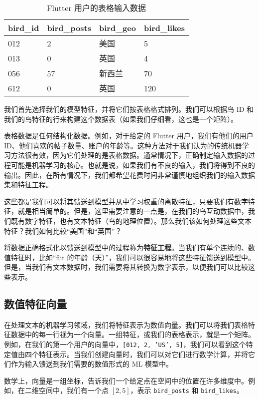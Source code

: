 \documentclass[Chinese, 11pt, table]{diazessay} %
\begin{document}
\begin{CJK}{UTF8}{gbsn}
\begin{sloppypar}
\begin{table}[H]
  \centering
    \caption{Flutter 用户的表格输入数据}
\begin{tabular}{|l|l|l|l|}
\hline
\rowcolor[HTML]{D5E7F7}
bird\_id & bird\_posts & bird\_geo & bird\_likes \\ \hline
012 	 & 2  		 & 美国   	 & 5  		 \\ \hline
013 	 & 0  		 & 英国   	 & 4  		 \\ \hline
056 	 & 57 		 & 新西兰   	 & 70 		 \\ \hline
612 	 & 0  		 & 英国   	 & 120		 \\ \hline
\end{tabular}
\end{table}

我们首先选择我们的模型特征，并将它们按表格格式排列。我们可以根据鸟 ID 和我们的鸟特征的行来构建这个数据表（如果我们仔细看，这也是一个矩阵）。

表格数据是任何结构化数据。例如，对于给定的 Flutter 用户，我们有他们的用户 ID、他们喜欢的帖子数量、账户的年龄等。这种方法对于我们认为的传统机器学习方法很有效，因为它们处理的是表格数据。通常情况下，正确制定输入数据的过程可能是机器学习的核心。也就是说，如果我们有不良的输入，我们将得到不良的输出。因此，在所有情况下，我们都希望花费时间非常谨慎地组织我们的输入数据集和特征工程。

这些都是我们可以将其馈送到模型并从中学习权重的离散特征，只要我们有数字特征，就是相当简单的。但是，这里需要注意的一点是，在我们的鸟互动数据中，我们既有数字特征，也有文本特征（鸟的地理位置）。那么我们该如何处理这些文本特征？我们如何比较“美国”和“英国”？

将数据正确格式化以馈送到模型中的过程称为\textbf{特征工程}。当我们有单个连续的、数值特征时，比如“flit 的年龄（天）”，我们可以很容易地将这些特征馈送到模型中。但是，当我们有文本数据时，我们需要将其转换为数字表示，以便我们可以比较这些表示。

\subsection{数值特征向量}
在处理文本的机器学习领域，我们将特征表示为数值向量。我们可以将我们表格特征数据中的每一行视为一个向量。一组特征，或我们的表格表示，就是一个矩阵。例如，在我们的第一个用户的向量中，\texttt{[012, 2, 'US', 5]}，我们可以看到这个特定值由四个特征表示。当我们创建向量时，我们可以对它们进行数学计算，并将它们作为输入馈送到我们需要的数值形式的 ML 模型中。

数学上，向量是一组坐标，告诉我们一个给定点在空间中的位置在许多维度中。例如，在二维空间中，我们有一个点 $[2,5]$，表示 \texttt{bird_posts} 和 \texttt{bird_likes}。


\end{sloppypar}
\end{CJK}
\end{document}
